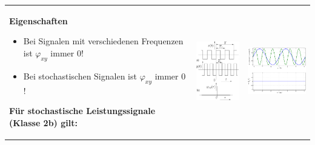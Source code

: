 		\begin{tabularx}{\textwidth}{llX}
		\parbox{10.5cm}{
			\textbf{Eigenschaften}
			\begin{itemize}
     			\item Bei Signalen mit verschiedenen Frequenzen ist $\varphi_{xy}$ immer $0$!
     			\item Bei stochastischen Signalen ist $\varphi_{xy}$ immer $0$!
   			\end{itemize}
   			
   			\textbf{Für stochastische Leistungssignale (Klasse 2b) gilt:} \\
   			\\
   		} 
   		&
   		\parbox{2.9cm}{
   			\includegraphics[width=2.9cm]{./bilder/kkf1.png}
   		} 
   		&
   		\parbox{3.9cm}{
   			\includegraphics[width=3.9cm]{./bilder/kkf2.png}
   		} 
   		\\
		\end{tabularx}
		
		
